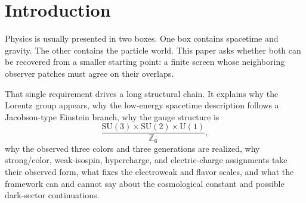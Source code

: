 \documentclass[11pt]{article}
\newcommand{\SU}{\mathrm{SU}}
\newcommand{\U}{\mathrm{U}}
\begin{document}
\begin{abstract}
The quantitative completion is formulated as a zero-input closure program with two constants rather
than fitted parameters. The local pixel fixed point is
\(P_\star=\varphi+\sqrt{\pi}/A_T(P_\star)\). The global capacity fixed point is the cosmic
record-closure fixed point \(N_{\mathrm{CRC}}=F(N_{\mathrm{CRC}})\), where
\[
F(N)=\operatorname{Cap}_{\mathrm{read}}
\bigl(\operatorname{Obs}(\operatorname{nf}(\mathfrak U_N))\bigr)
\]
is the active horizon capacity read back by observers inside the universe supplied with capacity
\(N\). The finite-count representation is
\[
N_\star=\operatorname{MAR}\arg\max_N(\log|\Omega^{\mathrm{sc}}_N|-N).
\]
A contraction certificate for \(F\), or equivalently a derivative-sign certificate for
\(\ell(N)=\log|\Omega^{\mathrm{sc}}_N|-N\), gives the unique stable fixed point. Informally,
\(P\) links outside screen-cell area to inside electromagnetic interaction/observation strength,
while \(N_{\mathrm{CRC}}\) links outside total horizon capacity to inside observer-accessible public
record capacity. The universe must be able to reconstruct its own boundary: observers inside infer
geometry, horizons, entropy, \(\Lambda\), history, and records from information available inside
the universe. Thus \(N_{\mathrm{CRC}}\) is the unique global capacity at which the universe reads
back its own boundary without deficit or slack. The cosmological readout is
\(\Lambda_{\mathrm{CRC}}=3\pi/(G N_{\mathrm{CRC}})\). On the observed branch this fixed point is the
de Sitter entropy capacity \(N_{\mathrm{CRC}}\simeq3.31\times10^{122}\). This compact paper isolates the recovered core and keeps it
distinct from the quantitative particle and continuation branches built on top of the same closure
data.
\end{abstract}

\section{Introduction}

Physics is usually presented in two boxes. One box contains spacetime and gravity. The other contains the particle world. This paper asks whether both can be recovered from a smaller starting point: a finite screen whose neighboring observer patches must agree on their overlaps.

That single requirement drives a long structural chain. It explains why the Lorentz group appears, why the low-energy spacetime description follows a Jacobson-type Einstein branch, why the gauge structure is
\[
\frac{\SU(3)\times\SU(2)\times\U(1)}{\mathbb Z_6},
\]
why the observed three colors and three generations are realized, why strong/color, weak-isospin, hypercharge, and electric-charge assignments take their observed form, what fixes the electroweak and flavor scales, and what the framework can and cannot say about the cosmological constant and possible dark-sector continuations.
\end{document}
